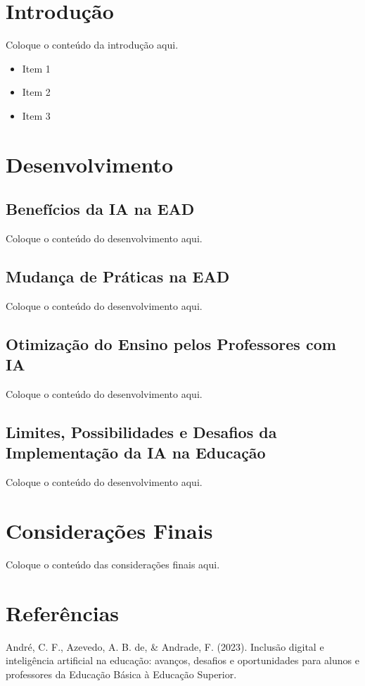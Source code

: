 \documentclass[
12pt,				%
openright,			%
oneside,			%
a4paper,			%
english,			%
french,				%
spanish,			%
brazil				%
]{abntex2}
\begin{document}
\tableofcontents*
\cleardoublepage
	

\textual

\renewcommand{\thesection}{\arabic{section}}
\renewcommand{\thesubsection}{\arabic{section}.\arabic{subsection}}

\section{Introdução}
Coloque o conteúdo da introdução aqui.

\begin{itemize}
    \item Item 1
    \item Item 2
    \item Item 3
\end{itemize}

\section{Desenvolvimento}

\subsection{Benefícios da IA na EAD}
Coloque o conteúdo do desenvolvimento aqui.


\subsection{Mudança de Práticas na EAD}
Coloque o conteúdo do desenvolvimento aqui.

\subsection{Otimização do Ensino pelos Professores com IA}
Coloque o conteúdo do desenvolvimento aqui.


\subsection{Limites, Possibilidades e Desafios da Implementação da IA na Educação}
Coloque o conteúdo do desenvolvimento aqui.

\section{Considerações Finais}
Coloque o conteúdo das considerações finais aqui.

\section{Referências}
André, C. F., Azevedo, A. B. de, \& Andrade, F. (2023). Inclusão digital e inteligência artificial na educação: avanços, desafios e oportunidades para alunos e professores da Educação Básica à Educação Superior.


\postextual
\end{document}
